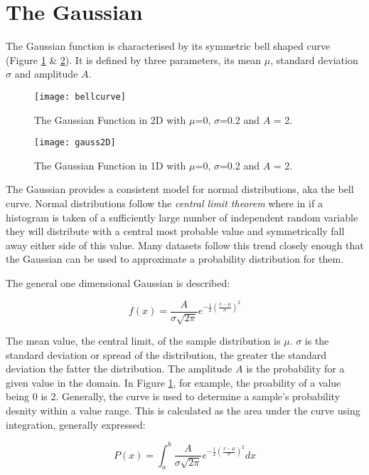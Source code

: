 \section{The Gaussian}

The Gaussian function is characterised by its symmetric bell shaped curve (Figure \ref{fig:gauss} \& \ref{fig:gausssurf}). It is defined by three parameters, its mean $\mu$, standard deviation $\sigma$ and amplitude $A$.

\begin{figure}[H]
    \centering
    \centering\texttt{[image: bellcurve]}
    \caption{The Gaussian Function in 2D with $\mu$=0, $\sigma$=0.2 and $A$ = 2.}
    \label{fig:gauss}
  \end{figure}

  \begin{figure}[H]
    \centering
    \centering\texttt{[image: gauss2D]}
    \caption{The Gaussian Function in 1D with $\mu$=0, $\sigma$=0.2 and $A$ = 2.}
    \label{fig:gausssurf}
  \end{figure}

  The Gaussian provides a consistent model for normal distributions, aka the bell curve. Normal distributions follow the \emph{central limit theorem} where in if a histogram is taken of a sufficiently large number of independent random variable they will distribute with a central most probable value and symmetrically fall away either side of this value. Many datasets follow this trend closely enough that the Gaussian can be used to approximate a probability distribution for them. 
  
  The general one dimensional Gaussian is described:  

\begin{equation}
    f(x) = \frac{A}{\sigma\sqrt{2\pi}}e^{-\frac{1}{2}(\frac{x-\mu}{\sigma})^2}
\label{eq:gauss}
\end{equation}

  The mean value, the central limit, of the sample distribution is $\mu$. $\sigma$ is the standard deviation or spread of the distribution, the greater the standard deviation the fatter the distribution. The amplitude $A$ is the probability for a given value in the domain. In Figure \ref{fig:gauss}, for example, the proability of a value being 0 is 2. Generally, the curve is used to determine a sample's probability desnity within a value range. This is calculated as the area under the curve using integration, generally expressed:
  
\begin{equation}
    P(x) = \int_{a}^{b}\frac{A}{\sigma\sqrt{2\pi}}e^{-\frac{1}{2}(\frac{x-\mu}{\sigma})^2}dx
    \label{eq:gausseg}
\end{equation}

